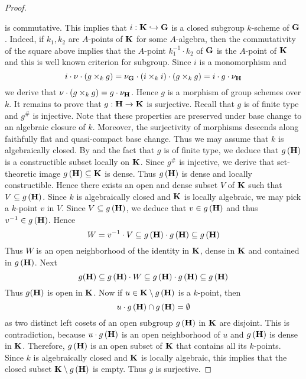 \begin{proof}
\begin{center}
\begin{tikzpicture}
\end{tikzpicture}
\end{center}
is commutative. This implies that $i:\bd{K} \hookrightarrow \bd{G}$ is a closed subgroup $k$-scheme of $\bd{G}$. Indeed, if $k_1,k_2$ are $A$-points of $\bd{K}$ for some $A$-algebra, then the commutativity of the square above implies that the $A$-point $k_1^{-1}\cdot k_2$ of $\bd{G}$ is the $A$-point of $\bd{K}$ and this is well known criterion for subgroup. Since $i$ is a monomorphism and
$$i\cdot \nu \cdot \left(g\times_k g\right) = \nu_{\bd{G}}\cdot \left(i\times_k i\right) \cdot \left(g\times_k g\right) = i \cdot g \cdot \nu_{\bd{H}}$$
we derive that $\nu \cdot \left(g\times_k g\right) = g\cdot \nu_{\bd{H}}$. Hence $g$ is a morphism of group schemes over $k$. It remains to prove that $g:\bd{H}\ra \bd{K}$ is surjective. Recall that $g$ is of finite type and $g^{\#}$ is injective. Note that these properties are preserved under base change to an algebraic closure of $k$. Moreover, the surjectivity of morphisms descends along faithfully flat and quasi-compact base change. Thus we may assume that $k$ is algebraically closed. By {\cite[Theorem 10.20]{gortz2010algebraic}} and the fact that $g$ is of finite type, we deduce that $g\left(\bd{H}\right)$ is a constructible subset locally on $\bd{K}$. Since $g^{\#}$ is injective, we derive that set-theoretic image $g\left(\bd{H}\right)\subseteq \bd{K}$ is dense. Thus $g\left(\bd{H}\right)$ is dense and locally constructible. Hence there exists an open and dense subset $V$ of $\bd{K}$ such that $V\subseteq g\left(\bd{H}\right)$. Since $k$ is algebraically closed and $\bd{K}$ is locally algebraic, we may pick a $k$-point $v$ in $V$. Since $V\subseteq g\left(\bd{H}\right)$, we deduce that $v\in g\left(\bd{H}\right)$ and thus $v^{-1}\in g\left(\bd{H}\right)$. Hence
$$W = v^{-1}\cdot V \subseteq g\left(\bd{H}\right)\cdot g\left(\bd{H}\right) \subseteq g\left(\bd{H}\right)$$
Thus $W$ is an open neighborhood of the identity in $\bd{K}$, dense in $\bd{K}$ and contained in $g\left(\bd{H}\right)$. Next
$$g(\bd{H}) \subseteq g\left(\bd{H}\right)\cdot W \subseteq g\left(\bd{H}\right)\cdot g\left(\bd{H}\right)\subseteq g\left(\bd{H}\right)$$
Thus $g(\bd{H})$ is open in $\bd{K}$. Now if $u\in \bd{K}\setminus g\left(\bd{H}\right)$ is a $k$-point, then
$$u\cdot g\left(\bd{H}\right)\cap g\left(\bd{H}\right) = \emptyset$$
as two distinct left cosets of an open subgroup $g\left(\bd{H}\right)$ in $\bd{K}$ are disjoint. This is contradiction, because $u\cdot g\left(\bd{H}\right)$ is an open neighborhood of $u$ and $g\left(\bd{H}\right)$ is dense in $\bd{K}$. Therefore, $g\left(\bd{H}\right)$ is an open subset of $\bd{K}$ that contains all its $k$-points. Since $k$ is algebraically closed and $\bd{K}$ is locally algebraic, this implies that the closed subset $\bd{K}\setminus g\left(\bd{H}\right)$ is empty. Thus $g$ is surjective.
\end{proof}

